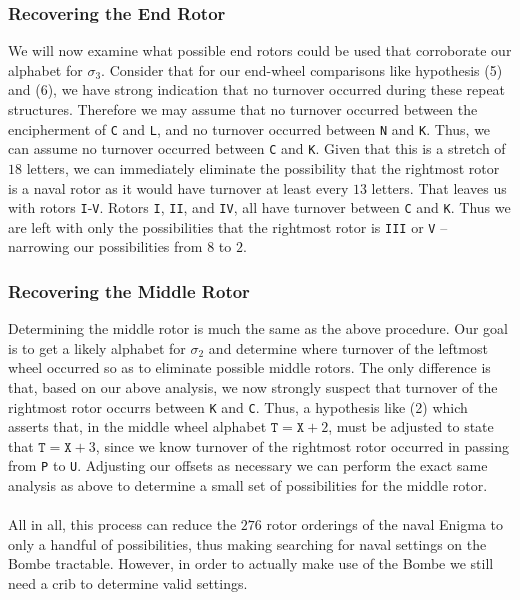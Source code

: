   \subsubsection{Recovering the End Rotor}
  We will now examine what possible end rotors could be used that
  corroborate our alphabet for $\sigma_3$. Consider that for our
  end-wheel comparisons like hypothesis (5) and (6), we have strong
  indication that no turnover occurred during these repeat
  structures. Therefore we may assume that no turnover occurred
  between the encipherment of \texttt{C} and \texttt{L}, and no
  turnover occurred between \texttt{N} and \texttt{K}. Thus, we can
  assume no turnover occurred between \texttt{C} and \texttt{K}.
  Given that this is a stretch of $18$ letters, we can immediately
  eliminate the possibility that the rightmost rotor is a naval rotor
  as it would have turnover at least every $13$ letters. That leaves
  us with rotors \texttt{I}-\texttt{V}. Rotors \texttt{I},
  \texttt{II}, and \texttt{IV}, all have turnover between \texttt{C}
  and \texttt{K}. Thus we are left with only the possibilities that
  the rightmost rotor is \texttt{III} or \texttt{V} -- narrowing our
  possibilities from $8$ to $2$.

  \subsubsection{Recovering the Middle Rotor}
  Determining the middle rotor is much the same as the above
  procedure. Our goal is to get a likely alphabet for $\sigma_2$ and
  determine where turnover of the leftmost wheel occurred so as to
  eliminate possible middle rotors. The only difference is that, based on our above analysis, we
  now strongly suspect that turnover of the rightmost rotor occurrs
  between \texttt{K} and \texttt{C}. Thus, a hypothesis like (2) which
  asserts that, in the middle wheel alphabet $\texttt{T} = \texttt{X}
  + 2$, must be adjusted to state that $\texttt{T} = \texttt{X} + 3$,
  since we know turnover of the rightmost rotor occurred in passing
  from \texttt{P} to \texttt{U}. Adjusting our offsets as necessary
  we can perform the exact same analysis as above to determine a
  small set of possibilities for the middle rotor.
  \\\\All in all, this process can reduce the $276$ rotor orderings
  of the naval Enigma to only a handful of possibilities, thus making
  searching for naval settings on the Bombe tractable. However, in
  order to actually make use of the Bombe we still need a crib to
  determine valid settings.

